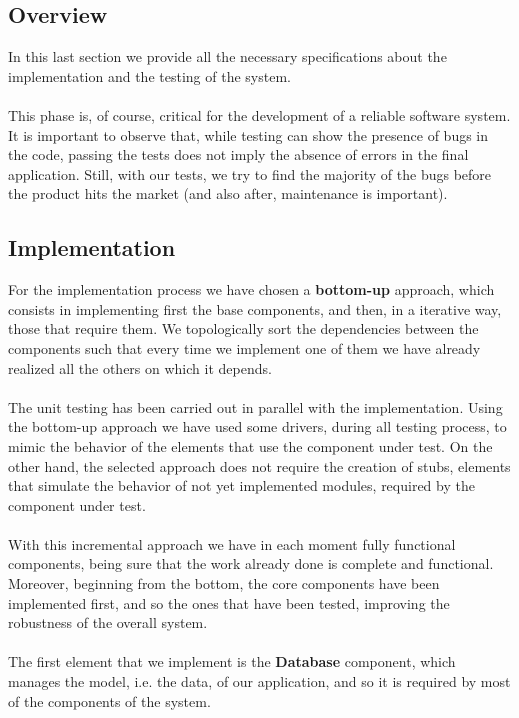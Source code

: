 \documentclass{article}
\begin{document}
\subsection{Overview}
In this last section we provide all the necessary specifications about the
implementation and the testing of the system.
\\\\
This phase is, of course, critical for the development of a reliable software
system. It is important to observe that, while testing can show the presence of
bugs in the code, passing the tests does not imply the absence of errors in the
final application. Still, with our tests, we try to find the majority of
the bugs before the product hits the market (and also after, maintenance is
important).

\subsection{Implementation}
For the implementation process we have chosen a \textbf{bottom-up}
approach, which consists in implementing first the base components, and then, in
a iterative way, those that require them. We topologically sort the dependencies
between the components such that every time we implement one of them we have
already realized all the others on which it depends.
\\\\
The unit testing has been carried out in parallel with the implementation. Using
the bottom-up approach we have used some drivers, during all testing process, to
mimic the behavior of the elements that use the component under test. On
the other hand, the selected approach does not require the creation of stubs,
elements that simulate the behavior of not yet implemented modules, required by
the component under test.
\\\\
With this incremental approach we have in each moment fully functional
components, being sure that the work already done is complete and functional.
Moreover, beginning from the bottom, the core components have been implemented
first, and so the ones that have been tested, improving the robustness of the
overall system.
\\\\
The first element that we implement is the \textbf{Database} component,
which manages the model, i.e. the data, of our application, and so it is
required by most of the components of the system.
\\\\
\end{document}
